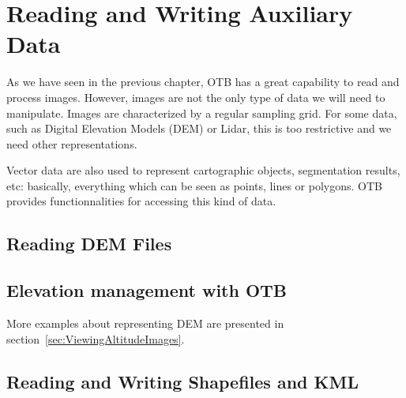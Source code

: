 \chapter{Reading and Writing Auxiliary Data}
\label{sec:ReadingAuxData}

As we have seen in the previous chapter, OTB has a great capability to
read and process images. However, images are not the only type of data
we will need to manipulate. Images are characterized by a regular
sampling grid. For some data, such as Digital Elevation Models (DEM)
or Lidar, this is too restrictive and we need other representations.

Vector data are also used to represent cartographic objects,
segmentation results, etc: basically, everything which can be seen as
points, lines or polygons. OTB provides functionnalities for accessing
this kind of data.

\section{Reading DEM Files}
\label{sec:ReadDEM}


\section{Elevation management with OTB}
\ifitkFullVersion
\label{sec:DEMHandler}
\fi


More examples about representing DEM are presented in section~\ref{sec:ViewingAltitudeImages}.

\section{Reading and Writing Shapefiles and KML}
\label{sec:ReadVectorData}


